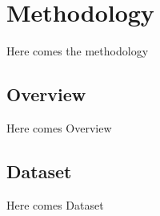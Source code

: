 \chapter{Methodology}
\label{sec:methodology}
Here comes the methodology
\section{Overview}
Here comes Overview
\section{Dataset}
\label{sec:dataset}
Here comes Dataset